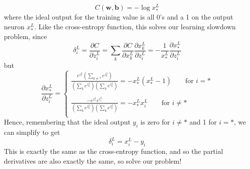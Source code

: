 \documentclass[10pt]{article}
\begin{document}
\[
C(\mathbf{w},\mathbf{b})= -\log x^L_*
\]
where the ideal output for the training value is all 0's and a 1 on the output neuron $x^L_*$. Like the cross-entropy function, this solves our learning slowdown problem, since
\[
\delta^{L}_i = \frac{\partial C}{\partial z^{L}_i} = \sum_{k} \frac{\partial C}{\partial x^{L}_k} \frac{\partial x^{L}_k}{\partial z^{L}_i}
=
-\frac{1}{x^{L}_*} \frac{\partial x^{L}_*}{\partial z^{L}_i}
\]
but
\[
\frac{\partial x^{L}_*}{\partial z^{L}_i} =
\begin{cases}
\frac{e^{z^L_*}\left( \sum_{k \neq *} e^{z^L_k}\right)}{\left(\sum_k e^{z^L_k}\right) \left(\sum_k e^{z^L_k}\right)} = -x^L_*\left(x^L_* -1\right) \qquad \text{for }i = *\\
\\
\frac{-e^{z^L_*}e^{z^L_i}}{\left(\sum_k e^{z^L_k}\right)\left(\sum_k e^{z^L_k}\right)} = -x^L_* x^L_i \qquad \text{for }i\neq *\\
\end{cases}
\]
Hence, remembering that the ideal output $y_i$ is zero for $i\neq *$ and 1 for $i=*$, we can simplify to get
\[
\delta^{L}_i = x^{L}_i - y_i
\]
This is exactly the same as the cross-entropy function, and so the partial derivatives are also exactly the same, so solve our problem!
\end{document}
